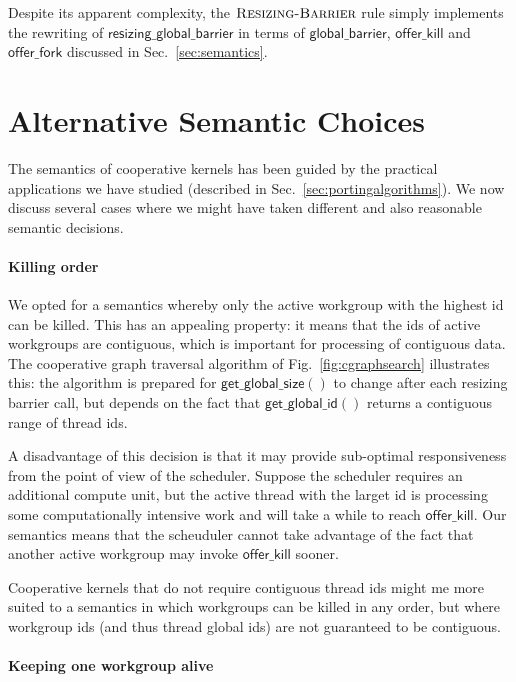 \documentclass[numbers,nocopyrightspace,10pt]{sigplanconf}
\newcommand{\myfig}{Fig.~}
\newcommand{\mysec}{Sec.~}
\newcommand{\offerfork}{\mathsf{offer\_fork}}
\newcommand{\offerkill}{\mathsf{offer\_kill}}
\newcommand{\globalbarrier}{\mathsf{global\_barrier}}
\newcommand{\resizingglobalbarrier}{\mathsf{resizing\_global\_barrier}}
\newcommand{\getglobalid}{\mathsf{get\_global\_id}}
\newcommand{\getglobalsize}{\mathsf{get\_global\_size}}
\begin{document}
Despite its apparent complexity, the $\textsc{Resizing-Barrier}$ rule simply implements the rewriting of $\resizingglobalbarrier$ in terms of $\globalbarrier$, $\offerkill$ and $\offerfork$ discussed in \mysec\ref{sec:semantics}.


\section{Alternative Semantic Choices}\label{appendix:semanticalternatives}

The semantics of cooperative kernels has been guided by the practical
applications we have studied (described in
\mysec\ref{sec:portingalgorithms}).  We now discuss several cases
where we might have taken different and also reasonable semantic
decisions.

\paragraph{Killing order}

We opted for a semantics whereby only the active workgroup with the
highest id can be killed.  This has an appealing property: it means
that the ids of active workgroups are contiguous, which is important
for processing of contiguous data.  The cooperative graph traversal
algorithm of \myfig\ref{fig:cgraphsearch} illustrates this: the
algorithm is prepared for $\getglobalsize()$ to change after each
resizing barrier call, but depends on the fact that $\getglobalid()$
returns a contiguous range of thread ids.

A disadvantage of this decision is that it may provide sub-optimal
responsiveness from the point of view of the scheduler.  Suppose the
scheduler requires an additional compute unit, but the active thread
with the larget id is processing some computationally intensive work
and will take a while to reach $\offerkill$.  Our semantics means that
the scheuduler cannot take advantage of the fact that another active
workgroup may invoke $\offerkill$ sooner.

Cooperative kernels that do not require contiguous thread ids might me
more suited to a semantics in which workgroups can be killed in any
order, but where workgroup ids (and thus thread global ids) are not
guaranteed to be contiguous.

\paragraph{Keeping one workgroup alive}
\end{document}
